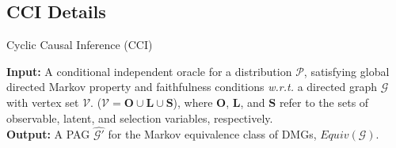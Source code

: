 \documentclass[twoside, 11pt]{article}
\begin{document}
\begin{appendices}







\pagebreak
\section{CCI Details}\label{algCCI}


\begin{algorithm} 
\caption{Cyclic Causal Inference (CCI)}
 \hspace*{\algorithmicindent} \textbf{Input:} A conditional independent oracle for a distribution $\mathcal{P}$, satisfying global directed Markov property and faithfulness conditions \textit{w.r.t.} a directed graph $\mathcal{G}$ with vertex set $\mathcal{V}$. ($\mathcal{V} = \mathbf{O} \cup \mathbf{L} \cup \mathbf{S}$), where $\mathbf{O}$, $\mathbf{L}$, and $\mathbf{S}$ refer to the sets of observable, latent, and selection variables, respectively.\\
 \hspace*{\algorithmicindent} \textbf{Output:} A PAG $\mathcal{\hat{G'}}$ for the Markov equivalence class of DMGs, $Equiv(\mathcal{G})$.



\end{algorithm}
\end{appendices}
\end{document}
